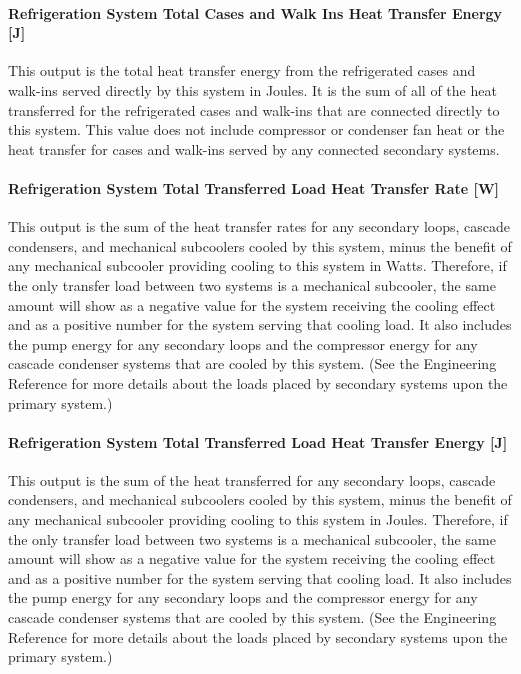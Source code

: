 \paragraph{Refrigeration System Total Cases and Walk Ins Heat Transfer Energy {[}J{]}}\label{refrigeration-system-total-cases-and-walk-ins-heat-transfer-energy-j}

This output is the total heat transfer energy from the refrigerated cases and walk-ins served directly by this system in Joules. It is the sum of all of the heat transferred for the refrigerated cases and walk-ins that are connected directly to this system. This value does not include compressor or condenser fan heat or the heat transfer for cases and walk-ins served by any connected secondary systems.

\paragraph{Refrigeration System Total Transferred Load Heat Transfer Rate {[}W{]}}\label{refrigeration-system-total-transferred-load-heat-transfer-rate-w}

This output is the sum of the heat transfer rates for any secondary loops, cascade condensers, and mechanical subcoolers cooled by this system, minus the benefit of any mechanical subcooler providing cooling to this system in Watts. Therefore, if the only transfer load between two systems is a mechanical subcooler, the same amount will show as a negative value for the system receiving the cooling effect and as a positive number for the system serving that cooling load. It also includes the pump energy for any secondary loops and the compressor energy for any cascade condenser systems that are cooled by this system. (See the Engineering Reference for more details about the loads placed by secondary systems upon the primary system.)

\paragraph{Refrigeration System Total Transferred Load Heat Transfer Energy {[}J{]}}\label{refrigeration-system-total-transferred-load-heat-transfer-energy-j}

This output is the sum of the heat transferred for any secondary loops, cascade condensers, and mechanical subcoolers cooled by this system, minus the benefit of any mechanical subcooler providing cooling to this system in Joules. Therefore, if the only transfer load between two systems is a mechanical subcooler, the same amount will show as a negative value for the system receiving the cooling effect and as a positive number for the system serving that cooling load. It also includes the pump energy for any secondary loops and the compressor energy for any cascade condenser systems that are cooled by this system. (See the Engineering Reference for more details about the loads placed by secondary systems upon the primary system.)

